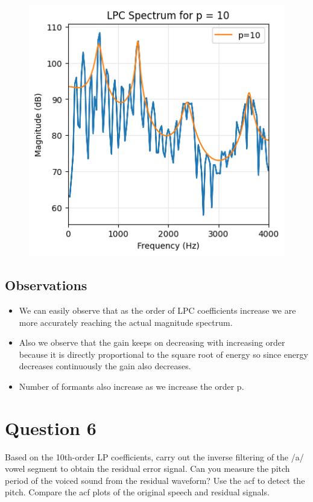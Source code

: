 \documentclass{article}
\begin{document}
\begin{figure}[H]
\begin{center}
\includegraphics[scale = 0.8]{10p.png}
\end{center}
\end{figure}



\subsection{Observations}
\begin{itemize}
\item We can easily observe that as the order of LPC coefficients increase we are more accurately reaching the actual magnitude spectrum.
\item Also we observe that the gain keeps on decreasing with increasing order because it is directly proportional to the square root of energy so since energy decreases continuously the gain also decreases.
\item Number of formants also increase as we increase the order p.
\end{itemize}

\section{Question 6}
Based on the 10th-order LP coefficients, carry out the inverse filtering of the /a/ vowel segment to obtain the residual error signal. Can you measure the pitch period of the voiced sound from the residual waveform? Use the acf to detect the pitch. Compare the acf plots of the original speech and residual signals.
\end{document}
